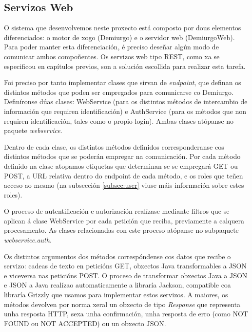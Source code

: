 \subsection{Servizos Web}
O sistema que desenvolvemos neste proxecto está composto por dous elementos
diferenciados: o motor de xogo (Demiurgo) e o servidor web (DemiurgoWeb). Para
poder manter esta diferenciación, é preciso deseñar algún modo de comunicar
ambos compoñentes. Os servizos web tipo REST, como xa se especificou en
capítulos previos, son a solución escollida para realizar esta tarefa.
\par
Foi preciso por tanto implementar clases que sirvan de \textit{endpoint}, que
definan os distintos métodos que poden ser empregados para comunicarse co
Demiurgo. Definíronse dúas clases: WebService (para os distintos métodos de
intercambio de información que requiren identificación) e AuthService (para os
métodos que non requiren identificación, tales como o propio login). Ambas
clases atópanse no paquete \textit{webservice}.
\par
Dentro de cada clase, os distintos métodos definidos corresponderanse cos
distintos métodos que se poderán empregar na comunicación. Por cada método
definido na clase atopamos etiquetas que determinan se se empregará GET ou POST,
a URL relativa dentro do endpoint de cada método, e os roles que teñen acceso ao
mesmo (na subsección \ref{subsec:user} viuse máis información sobre estes
roles).
\par
O proceso de autentificación e autorización realízase mediante filtros que se
aplican á clase WebService por cada petición que reciba, previamente a calquera
procesamento. As clases relacionadas con este proceso atópanse no subpaquete
\textit{webservice.auth}.
\par
Os distintos argumentos dos métodos correspóndense cos datos que recibe o
servizo: cadeas de texto en peticións GET, obxectos Java transformables a JSON e
viceversa nas peticións POST. O proceso de transformar obxectos Java a JSON e
JSON a Java realízao automaticamente a libraría Jackson, compatible coa libraría
Grizzly que usamos para implementar estos servizos. A maiores, os métodos
devolven por norma xeral un obxecto de tipo \textit{Response} que representa
unha resposta HTTP, sexa unha confirmación, unha resposta de erro (como NOT
FOUND ou NOT ACCEPTED) ou un obxecto JSON.

